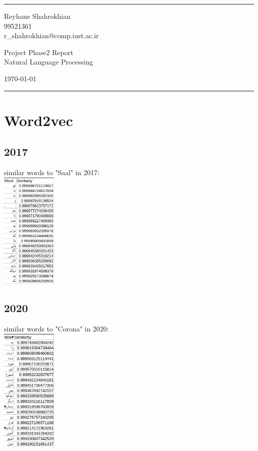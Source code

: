 \documentclass[a4paper]{article}
\begin{document}

\fancyhead[C]{}
\hrule \medskip %
\begin{minipage}{0.295\textwidth} 
\raggedright
\footnotesize
Reyhane Shahrokhian \hfill\\   
99521361\hfill\\
r\_shahrokhian@comp.iust.ac.ir
\end{minipage}
\begin{minipage}{0.4\textwidth} 
\centering 
\large 
Project Phase2 Report\\ 
\normalsize 
Natural Language Processing\\ 
\end{minipage}
\begin{minipage}{0.295\textwidth} 
\raggedleft
\today\hfill\\
\end{minipage}
\medskip\hrule 
\bigskip



\section{Word2vec}
\subsection{2017}
similar words to "Saal" in 2017:\\
\includegraphics[width=0.2\textwidth]{../reports/2017_report.png}\\
\subsection{2020}
similar words to "Corona" in 2020:\\
\includegraphics[width=0.2\textwidth]{../reports/2020_report.png}\\
\end{document}
